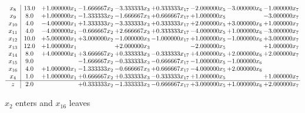 \documentclass[10pt]{article}
\begin{document}
 \[\begin{array}{c| c c@{\hskip 2pt} c@{\hskip 2pt} c@{\hskip 2pt} c@{\hskip 2pt} c@{\hskip 2pt} c@{\hskip 2pt} c@{\hskip 2pt} }
 x_{8}   &  13.0 & + 1.000000 x_{1} & -1.666667 x_{2} & -3.333333 x_{3} & + 0.333333 x_{17} & -2.000000 x_{5} & -3.000000 x_{6} & -1.000000 x_{7}\\
 x_{9}   &  8.0 & + 1.000000 x_{1} & -1.333333 x_{2} & -1.666667 x_{3} & + 0.666667 x_{17} & + 1.000000 x_{5} &   & -3.000000 x_{7}\\
 x_{10}   &  4.0 & -4.000000 x_{1} & + 1.333333 x_{2} & -3.333333 x_{3} & + 0.333333 x_{17} & + 2.000000 x_{5} & + 3.000000 x_{6} & + 1.000000 x_{7}\\
 x_{11}   &  4.0 & -4.000000 x_{1} & -0.666667 x_{2} & + 2.666667 x_{3} & + 0.333333 x_{17} & -4.000000 x_{5} & + 1.000000 x_{6} & -3.000000 x_{7}\\
 x_{12}   &  10.0 & + 5.000000 x_{1} & + 3.000000 x_{2} & -1.000000 x_{3} & -1.000000 x_{17} & + 1.000000 x_{5} & -1.000000 x_{6} & + 3.000000 x_{7}\\
 x_{13}   &  12.0 & + 1.000000 x_{1} &   & + 2.000000 x_{3} &   & -2.000000 x_{5} &   & + 1.000000 x_{7}\\
 x_{14}   &  8.0 & + 4.000000 x_{1} & + 3.666667 x_{2} & + 0.333333 x_{3} & -0.333333 x_{17} & + 4.000000 x_{5} & + 2.000000 x_{6} & + 2.000000 x_{7}\\
 x_{15}   &  9.0  &   & -1.666667 x_{2} & -0.333333 x_{3} & -0.666667 x_{17} & -1.000000 x_{5} & -1.000000 x_{6} &   \\
 x_{16}   &  4.0 & + 1.000000 x_{1} & -1.333333 x_{2} & -0.666667 x_{3} & + 0.666667 x_{17} & -4.000000 x_{5} & + 2.000000 x_{6} &   \\
 x_{4}   &  1.0 & + 1.000000 x_{1} & + 0.666667 x_{2} & + 0.333333 x_{3} & -0.333333 x_{17} & + 1.000000 x_{5} &   & + 1.000000 x_{7}\\
\hline
z    &  2.0  &   & + 0.333333 x_{2} & -1.333333 x_{3} & -0.666667 x_{17} & + 3.000000 x_{5} & + 1.000000 x_{6} & + 2.000000 x_{7}\\
\end{array}\]


 $ x_{2} $ enters and $ x_{16} $ leaves 
\end{document}

